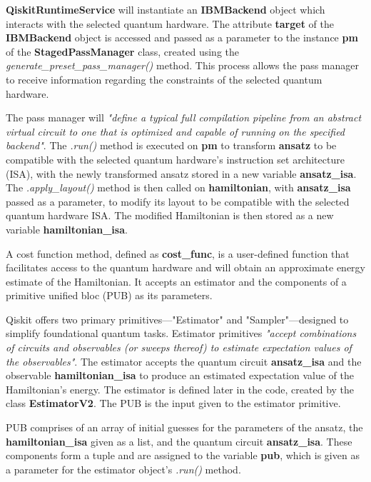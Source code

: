 \documentclass{article}
\begin{document}
{\textbf{QiskitRuntimeService} will instantiate an \textbf{IBMBackend} object which interacts with the selected quantum hardware. The attribute \textbf{target} of the \textbf{IBMBackend} object is accessed and passed as a parameter to the instance \textbf{pm} of the \textbf{StagedPassManager} class, created using the \textit{generate\_preset\_pass\_manager()} method. This process allows the pass manager to receive information regarding the constraints of the selected quantum hardware.

The pass manager will \textit{"define a typical full compilation pipeline from an abstract virtual circuit to one that is optimized and capable of running on the specified backend"}\cite{StagedPassManager}. The \textit{.run()} method is executed on \textbf{pm} to transform \textbf{ansatz} to be compatible with the selected quantum hardware's instruction set architecture (ISA)\cite{ISACirc}, with the newly transformed ansatz stored in a new variable \textbf{ansatz\_isa}. The \textit{.apply\_layout()} method is then called on \textbf{hamiltonian}, with \textbf{ansatz\_isa} passed as a parameter, to modify its layout to be compatible with the selected quantum hardware ISA. The modified Hamiltonian is then stored as a new variable  \textbf{hamiltonian\_isa}.

A cost function method, defined as \textbf{cost\_func}, is a user-defined function that facilitates access to the quantum hardware and will obtain an approximate energy estimate of the Hamiltonian. It accepts an estimator and the components of a primitive unified bloc (PUB) as its parameters. 

 Qiskit offers two primary primitives—"Estimator" and "Sampler"—designed to simplify foundational quantum tasks\cite{QiskitRuntime}. Estimator primitives \textit{"accept combinations of circuits and observables (or sweeps thereof) to estimate expectation values of the observables"}\cite{Primitives}. The estimator accepts the quantum circuit \textbf{ansatz\_isa} and the observable \textbf{hamiltonian\_isa} to produce an estimated expectation value of the Hamiltonian's energy. The estimator is defined later in the code, created by the class \textbf{EstimatorV2}. The PUB is the input given to the estimator primitive.

PUB comprises of an array of initial guesses for the parameters of the ansatz, the \textbf{hamiltonian\_isa} given as a list, and the quantum circuit \textbf{ansatz\_isa}. These components form a tuple and are assigned to the variable \textbf{pub}, which is given as a parameter for the estimator object's \textit{.run()} method. 

}
\end{document}
